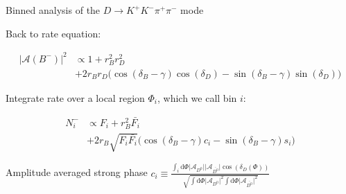 \documentclass{beamer}
\begin{document}
\begin{frame}{Binned analysis of the $D\to K^+K^-\pi^+\pi^-$ mode}
  \begin{center}
    \Large Back to rate equation:
  \end{center}
  \vspace{-0.3cm}
  \begin{align*}
    \lvert\mathcal{A}(B^-)\lvert^2&\propto1 + r_B^2r_D^2 \\
    &+ 2r_Br_D\big(\cos(\delta_B - \gamma)\cos(\delta_D) - \sin(\delta_B - \gamma)\sin(\delta_D)\big)
  \end{align*}
  \vspace{-0.7cm}
  \begin{center}
    \Large Integrate rate over a local region $\Phi_i$, which we call bin $i$:
  \end{center}
  \vspace{-0.3cm}
  \begin{align*}
    N_i^-&\propto F_i + r_B^2\bar{F_i} \\
    &+ 2r_B\sqrt{F_i\bar{F_i}}\big(\cos(\delta_B - \gamma)c_i - \sin(\delta_B - \gamma)s_i\big)
  \end{align*}
  \vspace{-0.7cm}
  \begin{center}
    \begin{minipage}{6cm}
      \begin{block}{\centering Amplitude averaged strong phase}
        \centering
        $c_i\equiv\frac{\int_i\mathrm{d}\Phi\lvert\mathcal{A}_{D^0}\lvert\lvert\mathcal{A}_{\bar{D^0}}\lvert\cos(\delta_D(\Phi))}{\sqrt{\int\mathrm{d}\Phi\lvert\mathcal{A}_{D^0}\lvert^2\int\mathrm{d}\Phi\lvert\mathcal{A}_{\bar{D^0}}\lvert^2}}$
      \end{block}
    \end{minipage}
  \end{center}
\end{frame}
\end{document}
